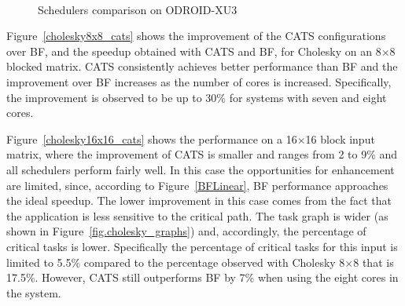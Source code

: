 \begin{figure}[!t]
{		\label{qr_cats}
	}
	\\
	\caption{Schedulers comparison on ODROID-XU3}
\end{figure}
Figure~\ref{cholesky8x8_cats} shows the improvement of the CATS configurations over BF, and the speedup obtained with CATS and BF, for Cholesky on an 8$\times$8 blocked matrix. 
CATS consistently achieves better performance than BF and the improvement over BF increases as the number of cores is increased. 
Specifically, the improvement is observed to be up to 30\% for systems with seven and eight cores. 

Figure~\ref{cholesky16x16_cats} shows the performance on a 16$\times$16 block input matrix, where the improvement of CATS is smaller and ranges from 2 to 9\% and all schedulers perform fairly well. 
In this case the opportunities for enhancement are limited, since, according to Figure~\ref{BFLinear}, BF performance approaches the ideal speedup. 
The lower improvement in this case comes from the fact that the application is less sensitive to the critical path. 
The task graph is wider (as shown in Figure~\ref{fig.cholesky_graphs}) and, accordingly, the percentage of critical tasks is lower. 
Specifically the percentage of critical tasks for this input is limited to 5.5\% compared to the percentage observed with Cholesky 8$\times$8 that is 17.5\%. 
However, CATS still outperforms BF by 7\% when using the eight cores in the system.%

